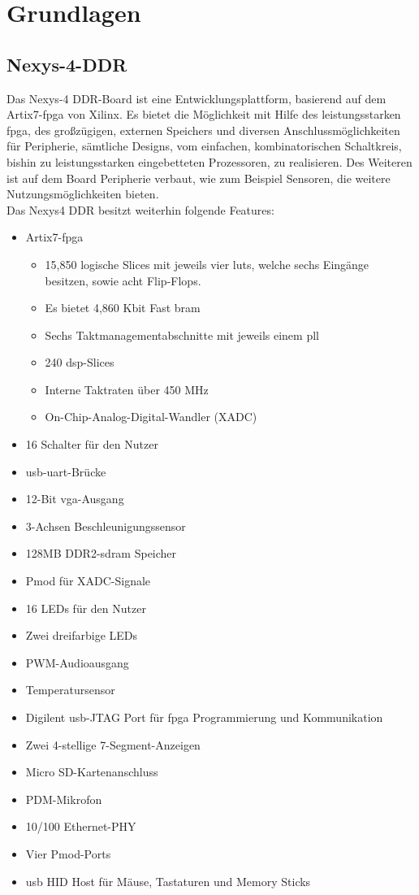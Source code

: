 \chapter{Grundlagen}\label{kap:grundlagen}


\section{Nexys-4-DDR}\label{kap:nexys4}
Das Nexys-4 DDR-Board ist eine Entwicklungsplattform, basierend auf dem Artix7-\ac{fpga}
von Xilinx. Es bietet die Möglichkeit mit Hilfe des leistungsstarken \ac{fpga}, des großzügigen, externen Speichers und diversen Anschlussmöglichkeiten
für Peripherie, sämtliche Designs, vom einfachen, kombinatorischen Schaltkreis, bishin zu leistungsstarken eingebetteten Prozessoren, zu realisieren.
Des Weiteren ist auf dem Board Peripherie verbaut, wie zum Beispiel Sensoren, die weitere Nutzungsmöglichkeiten bieten.\\
Das Nexys4 DDR besitzt weiterhin folgende Features:~\cite{digilent}\\
\begin{itemize}
  \item Artix7-\ac{fpga}
\begin{itemize}
  \item 15,850 logische Slices mit jeweils vier \acp{lut}, welche sechs Eingänge besitzen, sowie acht Flip-Flops.
  \item Es bietet 4,860 Kbit Fast \ac{bram}
  \item Sechs Taktmanagementabschnitte mit jeweils einem \ac{pll}
  \item 240 \ac{dsp}-Slices
  \item Interne Taktraten über 450 MHz
  \item On-Chip-Analog-Digital-Wandler (XADC)
\end{itemize}
  \item 16 Schalter für den Nutzer
  \item \ac{usb}-\ac{uart}-Brücke
  \item 12-Bit \ac{vga}-Ausgang
  \item 3-Achsen Beschleunigungssensor
  \item 128MB DDR2-\ac{sdram} Speicher
  \item Pmod für XADC-Signale
  \item 16 LEDs für den Nutzer
  \item Zwei dreifarbige LEDs
  \item PWM-Audioausgang
  \item Temperatursensor
  \item Digilent \ac{usb}-JTAG Port für \ac{fpga} Programmierung und Kommunikation
  \item Zwei 4-stellige 7-Segment-Anzeigen
  \item Micro SD-Kartenanschluss
  \item PDM-Mikrofon
  \item 10/100 Ethernet-PHY
  \item Vier Pmod-Ports
  \item \ac{usb} HID Host für Mäuse, Tastaturen und Memory Sticks

\end{itemize}


